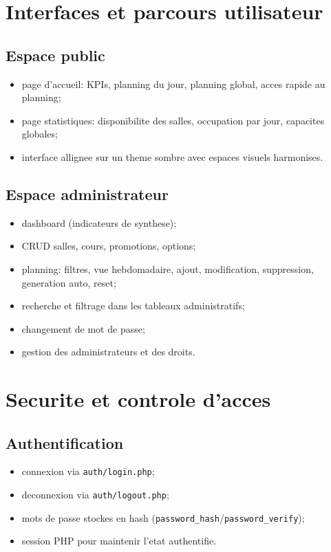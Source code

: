 \documentclass[12pt,a4paper]{article}
\begin{document}
\section{Interfaces et parcours utilisateur}
\subsection{Espace public}
\begin{itemize}[leftmargin=1.2cm]
    \item page d'accueil: KPIs, planning du jour, planning global, acces rapide au planning;
    \item page statistiques: disponibilite des salles, occupation par jour, capacites globales;
    \item interface allignee sur un theme sombre avec espaces visuels harmonises.
\end{itemize}

\subsection{Espace administrateur}
\begin{itemize}[leftmargin=1.2cm]
    \item dashboard (indicateurs de synthese);
    \item CRUD salles, cours, promotions, options;
    \item planning: filtres, vue hebdomadaire, ajout, modification, suppression, generation auto, reset;
    \item recherche et filtrage dans les tableaux administratifs;
    \item changement de mot de passe;
    \item gestion des administrateurs et des droits.
\end{itemize}

\section{Securite et controle d'acces}
\subsection{Authentification}
\begin{itemize}[leftmargin=1.2cm]
    \item connexion via \texttt{auth/login.php};
    \item deconnexion via \texttt{auth/logout.php};
    \item mots de passe stockes en hash (\texttt{password\_hash}/\texttt{password\_verify});
    \item session PHP pour maintenir l'etat authentifie.
\end{itemize}
\end{document}
